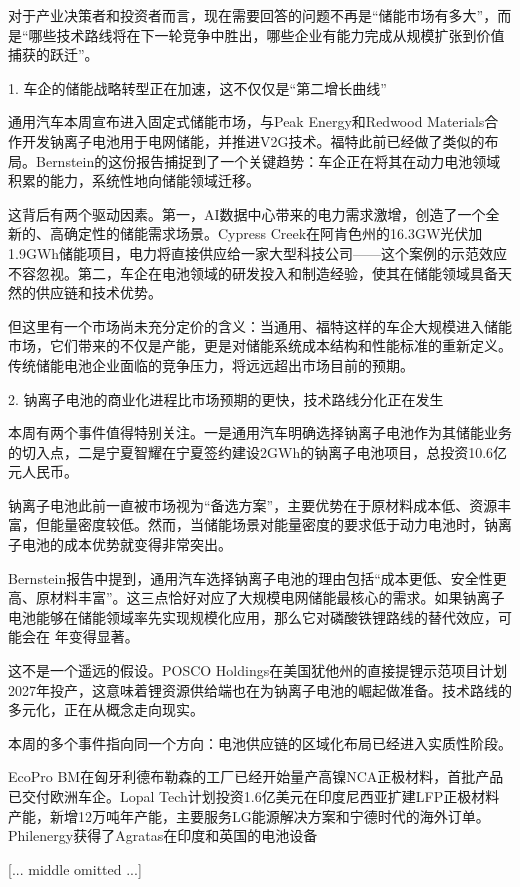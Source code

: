 \documentclass[11pt]{ctexart}
\begin{document}
对于产业决策者和投资者而言，现在需要回答的问题不再是“储能市场有多大”，而是“哪些技术路线将在下一轮竞争中胜出，哪些企业有能力完成从规模扩张到价值捕获的跃迁”。

1. 车企的储能战略转型正在加速，这不仅仅是“第二增长曲线”

通用汽车本周宣布进入固定式储能市场，与Peak Energy和Redwood Materials合作开发钠离子电池用于电网储能，并推进V2G技术。福特此前已经做了类似的布局。Bernstein的这份报告捕捉到了一个关键趋势：车企正在将其在动力电池领域积累的能力，系统性地向储能领域迁移。

这背后有两个驱动因素。第一，AI数据中心带来的电力需求激增，创造了一个全新的、高确定性的储能需求场景。Cypress Creek在阿肯色州的16.3GW光伏加1.9GWh储能项目，电力将直接供应给一家大型科技公司——这个案例的示范效应不容忽视。第二，车企在电池领域的研发投入和制造经验，使其在储能领域具备天然的供应链和技术优势。

但这里有一个市场尚未充分定价的含义：当通用、福特这样的车企大规模进入储能市场，它们带来的不仅是产能，更是对储能系统成本结构和性能标准的重新定义。传统储能电池企业面临的竞争压力，将远远超出市场目前的预期。

2. 钠离子电池的商业化进程比市场预期的更快，技术路线分化正在发生

本周有两个事件值得特别关注。一是通用汽车明确选择钠离子电池作为其储能业务的切入点，二是宁夏智耀在宁夏签约建设2GWh的钠离子电池项目，总投资10.6亿元人民币。

钠离子电池此前一直被市场视为“备选方案”，主要优势在于原材料成本低、资源丰富，但能量密度较低。然而，当储能场景对能量密度的要求低于动力电池时，钠离子电池的成本优势就变得非常突出。

Bernstein报告中提到，通用汽车选择钠离子电池的理由包括“成本更低、安全性更高、原材料丰富”。这三点恰好对应了大规模电网储能最核心的需求。如果钠离子电池能够在储能领域率先实现规模化应用，那么它对磷酸铁锂路线的替代效应，可能会在 年变得显著。

这不是一个遥远的假设。POSCO Holdings在美国犹他州的直接提锂示范项目计划2027年投产，这意味着锂资源供给端也在为钠离子电池的崛起做准备。技术路线的多元化，正在从概念走向现实。

本周的多个事件指向同一个方向：电池供应链的区域化布局已经进入实质性阶段。

EcoPro BM在匈牙利德布勒森的工厂已经开始量产高镍NCA正极材料，首批产品已交付欧洲车企。Lopal Tech计划投资1.6亿美元在印度尼西亚扩建LFP正极材料产能，新增12万吨年产能，主要服务LG能源解决方案和宁德时代的海外订单。Philenergy获得了Agratas在印度和英国的电池设备

[... middle omitted ...]
\end{document}
